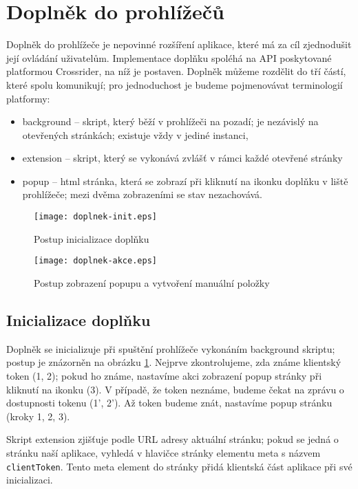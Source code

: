 \section{Doplněk do prohlížečů}

Doplněk do prohlížeče je nepovinné rozšíření aplikace, které má za cíl zjednodušit její ovládání uživatelům.
Implementace doplňku spoléhá na API poskytované platformou Crossrider, na níž je postaven.
Doplněk můžeme rozdělit do tří částí, které spolu komunikují; pro jednoduchost je budeme pojmenovávat terminologií platformy:
\begin{itemize}
	\item background -- skript, který běží v prohlížeči na pozadí; je nezávislý na otevřených stránkách; existuje vždy v jediné instanci,
	\item extension -- skript, který se vykonává zvlášť v rámci každé otevřené stránky
	\item popup -- html stránka, která se zobrazí při kliknutí na ikonku doplňku v liště prohlížeče; mezi dvěma zobrazeními se stav nezachovává.
\end{itemize}

\begin{figure}
	\centering
	\texttt{[image: doplnek-init.eps]}
	\caption{Postup inicializace doplňku}
	\label{fig:doplnek-init}
\end{figure}
\begin{figure}
	\centering
	\texttt{[image: doplnek-akce.eps]}
	\caption{Postup zobrazení popupu a vytvoření manuální položky}
	\label{fig:doplnek-akce}
\end{figure}

\subsection{Inicializace doplňku}

Doplněk se inicializuje při spuštění prohlížeče vykonáním background skriptu; postup je znázorněn na obrázku \ref{fig:doplnek-init}.
Nejprve zkontrolujeme, zda známe klientský token (1, 2); pokud ho známe, nastavíme akci zobrazení popup stránky při kliknutí na ikonku (3).
V případě, že token neznáme, budeme čekat na zprávu o dostupnosti tokenu (1', 2').
Až token budeme znát, nastavíme popup stránku (kroky 1, 2, 3).

Skript extension zjišťuje podle URL adresy aktuální stránku; pokud se jedná o stránku naší aplikace, vyhledá v hlavičce stránky elementu meta s názvem \verb|clientToken|.
Tento meta element do stránky přidá klientská část aplikace při své inicializaci.


